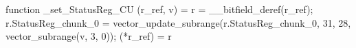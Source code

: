function _set_StatusReg_CU (r_ref, v) = {
    r = __bitfield_deref(r_ref);
    r.StatusReg_chunk_0 = vector_update_subrange(r.StatusReg_chunk_0, 31, 28, vector_subrange(v, 3, 0));
    (*r_ref) = r
}
